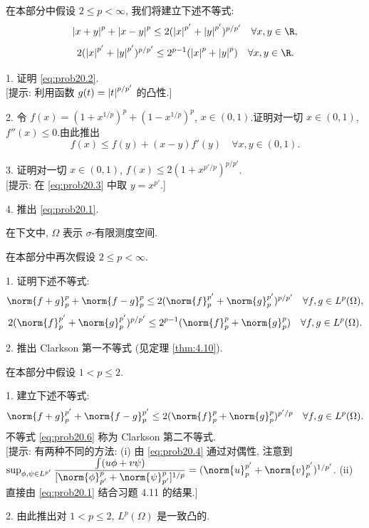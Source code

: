 \begin{problem}
\label{prob:20}


在本部分中假设 $2\le p<\infty$, 我们将建立下述不等式:
\begin{equation}
\abs{x+y}^p+\abs{x-y}^p\le2(\abs{x}^{p'}+\abs{y}^{p'})^{p/p'}\quad\forall x,y\in\R,
\label{eq:prob20.1}
\end{equation}
\begin{equation}
2(\abs{x}^{p'}+\abs{y}^{p'})^{p/p'}\le2^{p-1}(\abs{x}^p+\abs{y}^p)\quad\forall x,y\in\R.
\label{eq:prob20.2}
\end{equation}

1. 证明 \eqref{eq:prob20.2}.\\
{[提示: 利用函数 $g(t)=\left|t\right|^{p/p'}$ 的凸性.]}

2. 令 $f(x)=(1+x^{1/p})^p+(1-x^{1/p})^p$, $x\in(0,1)$.证明对一切 $x\in(0,1)$,
$f''(x)\le0$.由此推出
\begin{equation}
f(x)\le f(y)+(x-y)f'(y)\quad\forall x,y\in(0,1).
\label{eq:prob20.3}
\end{equation}

3. 证明对一切 $x\in(0,1)$, $f(x)\le2(1+x^{p'/p})^{p/p'}$.\\
{[提示: 在 \eqref{eq:prob20.3} 中取 $y=x^{p'}$.]}

4. 推出 \eqref{eq:prob20.1}.

在下文中, $\Omega$ 表示 $\sigma$-有限测度空间.


在本部分中再次假设 $2\le p<\infty$.

1. 证明下述不等式:
\begin{equation}
\norm{f+g}_p^p+\norm{f-g}_p^p\le2(\norm{f}_p^{p'}+\norm{g}_p^{p'})^{p/p'}\quad\forall f,g\in L^p(\Omega),
\label{eq:prob20.4}
\end{equation}
\begin{equation}
2(\norm{f}_p^{p'}+\norm{g}_p^{p'})^{p/p'}\le2^{p-1}(\norm{f}_p^p+\norm{g}_p^p)\quad\forall f,g\in L^p(\Omega).
\label{eq:prob20.5}
\end{equation}

2. 推出 Clarkson 第一不等式 (见定理  \ref{thm:4.10}).


在本部分中假设 $1<p\le2$.

1. 建立下述不等式:
\begin{equation}
\norm{f+g}_p^{p'}+\norm{f-g}_p^{p'}\le2(\norm{f}_p^p+\norm{g}_p^p)^{p'/p}\quad\forall f,g\in L^p(\Omega).
\label{eq:prob20.6}
\end{equation}
不等式 \eqref{eq:prob20.6} 称为 Clarkson 第二不等式.\\
{[提示: 有两种不同的方法:
(i) 由 \eqref{eq:prob20.4} 通过对偶性, 注意到
$\sup_{\phi,\psi\in L^{p'}}\dfrac{\int(u\phi+v\psi)}{[\norm{\phi}_{p'}^p+\norm{\psi}_{p'}^p]^{1/p}}=(\norm{u}_p^{p'}+\norm{v}_p^{p'})^{1/p'}$.
(ii) 直接由 \eqref{eq:prob20.1} 结合习题 4.11 的结果.]}

2. 由此推出对 $1<p\le2$, $L^p(\Omega)$ 是一致凸的.
\end{problem}
